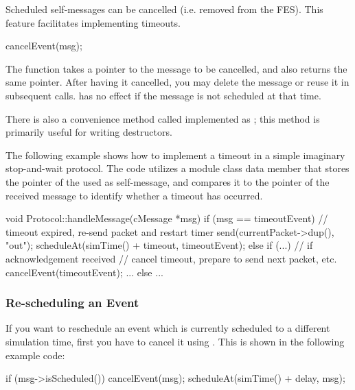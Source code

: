 Scheduled self-messages can be cancelled
 (i.e. removed from the FES).
This feature facilitates implementing timeouts.

\begin{cpp}
cancelEvent(msg);
\end{cpp}

The  function takes a pointer to the message to
be cancelled, and also returns the same pointer. After having it
cancelled, you may delete the message or reuse it in subsequent
 calls.  has no effect if
the message is not scheduled at that time.

There is also a convenience method called 
implemented as ;
this method is primarily useful for writing destructors.

The following example shows how to implement a timeout in a simple
imaginary stop-and-wait protocol. The code utilizes a 
module class data member that stores the pointer of the  used
as self-message, and compares it to the pointer of the received message
to identify whether a timeout has occurred.

\begin{cpp}
void Protocol::handleMessage(cMessage *msg)
{
    if (msg == timeoutEvent) {
        // timeout expired, re-send packet and restart timer
        send(currentPacket->dup(), "out");
        scheduleAt(simTime() + timeout, timeoutEvent);
    }
    else if (...) {  // if acknowledgement received
        // cancel timeout, prepare to send next packet, etc.
        cancelEvent(timeoutEvent);
        ...
    }
    else {
       ...
    }
}
\end{cpp}


\subsubsection{Re-scheduling an Event}

If you want to reschedule an event which is currently scheduled to a different
simulation time, first you have to cancel it using .
This is shown in the following example code:

\begin{cpp}
if (msg->isScheduled())
    cancelEvent(msg);
scheduleAt(simTime() + delay, msg);
\end{cpp}


